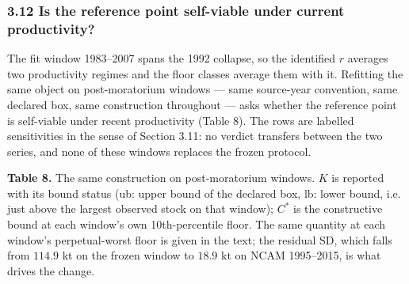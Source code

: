 \documentclass[11pt]{article}
\begin{document}
\subsubsection{3.12 Is the reference point self-viable under current
productivity?}\label{budget-is-the-reference-point-self-viable-under-current-productivity}

The fit window 1983--2007 spans the 1992 collapse, so the identified \(r\)
averages two productivity regimes and the floor classes average them with it.
Refitting the same object on post-moratorium windows --- same source-year
convention, same declared box, same construction throughout --- asks whether
the reference point is self-viable under recent productivity (Table 8). The
rows are labelled sensitivities in the sense of Section 3.11: no verdict
transfers between the two series, and none of these windows replaces the frozen
protocol.

\textbf{Table 8.} The same construction on post-moratorium windows. \(K\)
is reported with its bound status (ub: upper bound of the declared box,
lb: lower bound, i.e. just above the largest observed stock on that
window); \(C^*\) is the constructive bound at each window's own
10th-percentile floor. The same quantity at each window's perpetual-worst
floor is given in the text; the residual SD, which falls from \(114.9\) kt on
the frozen window to \(18.9\) kt on NCAM 1995--2015, is what drives the change.
\end{document}

